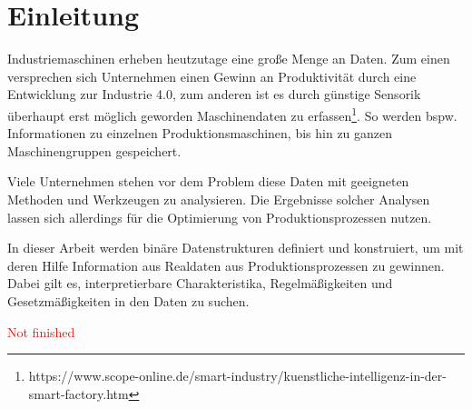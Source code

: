 \chapter{Einleitung}
\label{chp:introduction}
Industriemaschinen erheben heutzutage eine große Menge an Daten. Zum einen versprechen sich Unternehmen einen Gewinn an Produktivität durch eine Entwicklung zur Industrie 4.0, zum anderen ist es durch günstige Sensorik überhaupt erst möglich geworden Maschinendaten zu erfassen\footnote{https://www.scope-online.de/smart-industry/kuenstliche-intelligenz-in-der-smart-factory.htm}. So werden bspw. Informationen zu einzelnen Produktionsmaschinen, bis hin zu ganzen Maschinengruppen gespeichert.
 
Viele Unternehmen stehen vor dem Problem diese Daten mit geeigneten Methoden und Werkzeugen zu analysieren. Die Ergebnisse solcher Analysen lassen sich allerdings für die Optimierung von Produktionsprozessen nutzen.

In dieser Arbeit werden binäre Datenstrukturen definiert und konstruiert, um mit deren Hilfe Information aus Realdaten aus Produktionsprozessen zu gewinnen. Dabei gilt es, interpretierbare Charakteristika, Regelmäßigkeiten und Gesetzmäßigkeiten in den Daten zu suchen.

\textcolor{red}{Not finished}